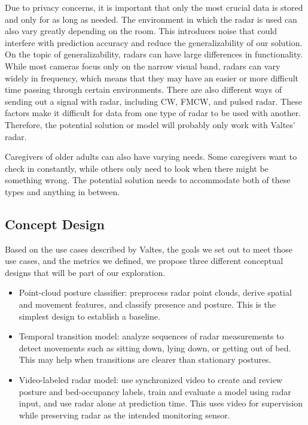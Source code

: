 Due to privacy concerns, it is important that only the most crucial data is stored and only for as long as needed. The environment in which the radar is used can also vary greatly depending on the room. This introduces noise that could interfere with prediction accuracy and reduce the generalizability of our solution. On the topic of generalizability, radars can have large differences in functionality. While most cameras focus only on the narrow visual band, radars can vary widely in frequency, which means that they may have an easier or more difficult time passing through certain environments. There are also different ways of sending out a signal with radar, including CW, FMCW, and pulsed radar. These factors make it difficult for data from one type of radar to be used with another. Therefore, the potential solution or model will probably only work with Valtes' radar.

Caregivers of older adults can also have varying needs. Some caregivers want to check in constantly, while others only need to look when there might be something wrong. The potential solution needs to accommodate both of these types and anything in between.

\subsection{Concept Design}
Based on the use cases described by Valtes, the goals we set out to meet those use cases, and the metrics we defined, we propose three different conceptual designs that will be part of our exploration.

\begin{itemize}[itemsep=0.25em,topsep=0.4em]
    \item Point-cloud posture classifier: preprocess radar point clouds, derive spatial and movement features, and classify presence and posture. This is the simplest design to establish a baseline.
    \item Temporal transition model: analyze sequences of radar measurements to detect movements such as sitting down, lying down, or getting out of bed. This may help when transitions are clearer than stationary postures.
    \item Video-labeled radar model: use synchronized video to create and review posture and bed-occupancy labels, train and evaluate a model using radar input, and use radar alone at prediction time. This uses video for supervision while preserving radar as the intended monitoring sensor.
\end{itemize}


